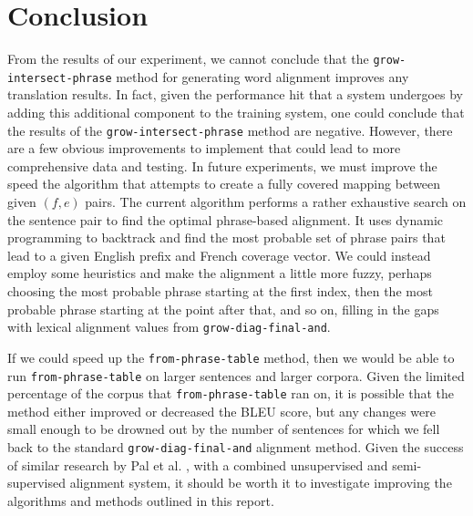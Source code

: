 \documentclass[twocolumn]{article}
\newcommand{\originalAlign}{\texttt{grow-diag-final-and}}
\newcommand{\phraseAlign}{\texttt{from-phrase-table}}
\newcommand{\phraseIntersectAlign}{\texttt{grow-intersect-phrase}}
\begin{document}
\section{Conclusion}
From the results of our experiment, we cannot conclude that the
\phraseIntersectAlign{} method for generating word alignment improves any
translation results. In fact, given the performance hit that a system undergoes
by adding this additional component to the training system, one could conclude
that the results of the \phraseIntersectAlign{} method are negative.
However, there are a few obvious improvements to implement that could lead to
more comprehensive data and testing. In future experiments, we must improve the
speed the algorithm that attempts to create a fully covered mapping between
given $(f, e)$ pairs. The current algorithm performs a rather exhaustive search
on the sentence pair to find the optimal phrase-based alignment. It uses dynamic
programming to backtrack and find the most probable set of phrase pairs that
lead to a given English prefix and French coverage vector.
We could instead employ some heuristics and make the alignment a little more
fuzzy, perhaps choosing the most probable phrase starting at the first index,
then the most probable phrase starting at the point after that, and so on,
filling in the gaps with lexical alignment values from \originalAlign{}.

If we could speed up the \phraseAlign{} method, then we would be able to run
\phraseAlign{} on larger sentences and larger corpora. Given the limited
percentage of the corpus that \phraseAlign{} ran on, it is possible that the
method either improved or decreased the BLEU score, but any changes were small
enough to be drowned out by the number of sentences for which we fell back to
the standard \originalAlign{} alignment method. Given the success of
similar research by Pal et al. \cite{pnb2013}, with a combined unsupervised and
semi-supervised alignment system, it should be worth it to investigate improving
the algorithms and methods outlined in this report.
\end{document}
